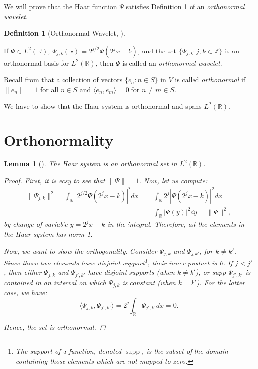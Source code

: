 \documentclass[11pt]{amsart}
\theoremstyle{theorem} %
\newtheorem{lem}[thm]{Lemma} %
\theoremstyle{definition}
\newtheorem{defn}[thm]{Definition}
\theoremstyle{example}
\theoremstyle{remark}
\numberwithin{equation}{section}
\newcommand{\R}{\mathbb{R}}
\newcommand{\Z}{\mathbb{Z}}
\DeclareMathOperator*{\supp}{supp}
\begin{document}
	We will prove that the Haar function $ \varPsi $ satisfies Definition \ref{orthonormal wavelet} of an \emph{orthonormal wavelet}.

\begin{defn}[Orthonormal Wavelet, {\cite[303]{pinsky}}] \label{orthonormal wavelet}
	
	If $ \varPsi \in L^2(\R) $, $ \varPsi_{j,k}(x) = 2^{j/2} \varPsi (2^j x-k) $, and the set $ \{ \varPsi_{j,k}: j,k \in \Z \} $ is an orthonormal basis for $ L^2(\R) $, then $ \varPsi $ is called an \emph{orthonormal wavelet}.
\end{defn}

Recall from \cite[128]{davidson} that a collection of vectors $ \{ e_n: n \in S \} $ in $ V $ is called \emph{orthonormal} if $ \|e_n\|=1 $ for all $ n \in S $ and $ \langle  e_n, e_m \rangle =0 $ for $ n \neq m \in S $. 



We have to show that the Haar system is orthonormal and spans $ L^2(\R) $.

\section{Orthonormality}
\begin{lem}[{\cite[409]{davidson}}] \label{lem:orthonormal}
	The Haar system is an orthonormal set in $ L^2(\R) $.
	
	\begin{proof}
		First, it is easy to see that $ \| \varPsi \| = 1 $. Now, let us compute:
		\begin{align*}
		\| \varPsi_{j,k} \|^2 = \int_{\R} \left| 2^{j/2} \varPsi(2^{j} x - k) \right|^2 dx 
		&=   \int_{\R} 2^j \left| \varPsi(2^{j} x - k) \right|^2 dx \\
		&= \int_{\R} \left| \varPsi(y) \right|^2 dy
		= \| \varPsi \|^2,
		\end{align*}
		by change of variable $ y = 2^{j}x-k $ in the integral. Therefore, all the elements in the Haar system has norm 1.
		
		Now, we want to show the orthogonality. Consider $ \varPsi_{j,k} $ and $ \varPsi_{j,k'} $, for $ k \neq k' $. Since these two elements have disjoint support\footnote{The \emph{support} of a function, denoted $ \supp $, is the subset of the domain containing those elements which are not mapped to zero.}, their inner product is 0. If $ j < j' $, then either $ \varPsi_{j,k} $ and $ \varPsi_{j',k'} $ have disjoint supports (when $ k \neq k' $), or supp $ \varPsi_{j',k'} $ is contained in an interval on which $ \varPsi_{j,k} $ is constant (when $ k = k' $). For the latter case, we have:
		\[ \langle \varPsi_{j,k}, \varPsi_{j',k'} \rangle = 2^j \int_{\R} \varPsi_{j',k'} dx = 0. \]
	
		Hence, the set is orthonormal.
	\end{proof}
\end{lem}
\end{document}
